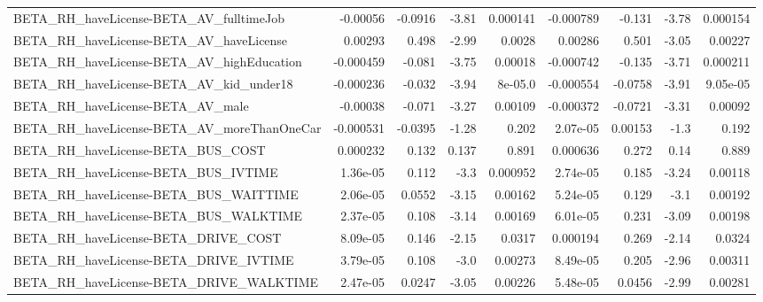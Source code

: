 \begin{tabular}{lrrrrrrrr}
BETA\_RH\_haveLicense-BETA\_AV\_fulltimeJob            &    -0.00056 &      -0.0916 &    -3.81 & 0.000141 &  -0.000789 &      -0.131 &        -3.78 &      0.000154 \\
BETA\_RH\_haveLicense-BETA\_AV\_haveLicense            &     0.00293 &        0.498 &    -2.99 &   0.0028 &    0.00286 &       0.501 &        -3.05 &       0.00227 \\
BETA\_RH\_haveLicense-BETA\_AV\_highEducation          &   -0.000459 &       -0.081 &    -3.75 &  0.00018 &  -0.000742 &      -0.135 &        -3.71 &      0.000211 \\
BETA\_RH\_haveLicense-BETA\_AV\_kid\_under18            &   -0.000236 &       -0.032 &    -3.94 &  8e-05.0 &  -0.000554 &     -0.0758 &        -3.91 &      9.05e-05 \\
BETA\_RH\_haveLicense-BETA\_AV\_male                   &    -0.00038 &       -0.071 &    -3.27 &  0.00109 &  -0.000372 &     -0.0721 &        -3.31 &       0.00092 \\
BETA\_RH\_haveLicense-BETA\_AV\_moreThanOneCar         &   -0.000531 &      -0.0395 &    -1.28 &    0.202 &   2.07e-05 &     0.00153 &         -1.3 &         0.192 \\
BETA\_RH\_haveLicense-BETA\_BUS\_COST                  &    0.000232 &        0.132 &    0.137 &    0.891 &   0.000636 &       0.272 &         0.14 &         0.889 \\
BETA\_RH\_haveLicense-BETA\_BUS\_IVTIME                &    1.36e-05 &        0.112 &     -3.3 & 0.000952 &   2.74e-05 &       0.185 &        -3.24 &       0.00118 \\
BETA\_RH\_haveLicense-BETA\_BUS\_WAITTIME              &    2.06e-05 &       0.0552 &    -3.15 &  0.00162 &   5.24e-05 &       0.129 &         -3.1 &       0.00192 \\
BETA\_RH\_haveLicense-BETA\_BUS\_WALKTIME              &    2.37e-05 &        0.108 &    -3.14 &  0.00169 &   6.01e-05 &       0.231 &        -3.09 &       0.00198 \\
BETA\_RH\_haveLicense-BETA\_DRIVE\_COST                &    8.09e-05 &        0.146 &    -2.15 &   0.0317 &   0.000194 &       0.269 &        -2.14 &        0.0324 \\
BETA\_RH\_haveLicense-BETA\_DRIVE\_IVTIME              &    3.79e-05 &        0.108 &     -3.0 &  0.00273 &   8.49e-05 &       0.205 &        -2.96 &       0.00311 \\
BETA\_RH\_haveLicense-BETA\_DRIVE\_WALKTIME            &    2.47e-05 &       0.0247 &    -3.05 &  0.00226 &   5.48e-05 &      0.0456 &        -2.99 &       0.00281 \\

\end{tabular}
